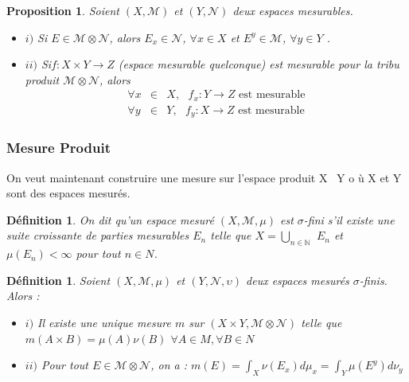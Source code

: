 \documentclass[3pt]{article}
\newtheorem{definition}[theorem]{D\'{e}finition}
\newtheorem{proposition}[theorem]{Proposition}
\begin{document}
\begin{proposition}
Soient $(X,\mathcal{M})$ et $(Y,\mathcal{N})$ deux espaces mesurables.

\begin{itemize}
\item $i)$ Si $E\in \mathcal{M}\otimes \mathcal{N}$, alors $E_{x}\in 
\mathcal{N}$, $\forall x\in X$ et $E^{y}\in \mathcal{M}$, $\forall y\in Y$ .

\item $ii)$ Si$f:X\times Y\rightarrow Z$ (espace mesurable quelconque) est
mesurable pour la tribu produit $\mathcal{M}\otimes \mathcal{N}$, alors%
\begin{eqnarray*}
\forall x &\in &X,\text{ }f_{x}:Y\rightarrow Z\text{ est mesurable} \\
\forall y &\in &Y,\text{ }f_{y}:X\rightarrow Z\text{ est mesurable}
\end{eqnarray*}
\end{itemize}
\end{proposition}

\subsubsection{Mesure Produit}

On veut maintenant construire une mesure sur l'espace produit X \times\ Y o%
\`{u} X et Y sont des espaces mesur\'{e}s.

\bigskip 

\begin{definition}
On dit qu'un espace mesur\'{e} $(X,\mathcal{M},\mu )$ est $\sigma $-fini
s'il existe une suite croissante de parties mesurables $E_{n}$ telle que $%
X=\bigcup_{n\in \mathbb{N}}$ $E_{n}$ et $\mu (E_{n})<\infty $ pour tout $%
n\in N$.
\end{definition}

\bigskip 

\begin{definition}
Soient $(X,\mathcal{M},\mu )$ et $(Y,\mathcal{N},\upsilon )$ deux espaces
mesur\'{e}s $\sigma $-finis. Alors :

\begin{itemize}
\item $i)$ Il existe une unique mesure $m$ sur $(X\times Y,\mathcal{M}%
\otimes \mathcal{N})$ telle que $m(A\times B)=\mu (A)\nu (B)$ $\forall A\in
M,\forall B\in N$

\item $ii)$ Pour tout $E\in \mathcal{M}\otimes \mathcal{N}$, on a : $%
m(E)=\int_{X}\nu (E_{x})d\mu _{x}=\int_{Y}\mu (E^{y})d\nu _{y}$
\end{itemize}
\end{definition}
\end{document}
